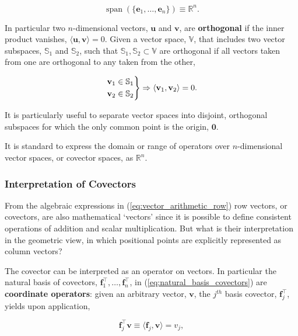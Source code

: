 \documentclass[12pt, twoside, draft]{article}
\begin{document}
\begin{equation}\label{eq:real_space}
\operatorname{span}(\{\mathbf{e}_1, \ldots, \mathbf{e}_n\}) \equiv \mathbb{R}^n.
\end{equation}

In particular two $n$-dimensional vectors, $\mathbf{u}$ and $\mathbf{v}$, are \textbf{orthogonal} if the inner product vanishes, $\langle \mathbf{u}, \mathbf{v} \rangle = 0$.  Given a vector space, $\mathbb{V}$, that includes two vector subspaces, $\mathbb{S}_1$ and $\mathbb{S}_2$, such that $\mathbb{S}_1, \mathbb{S}_2 \subset \mathbb{V}$ are orthogonal if all vectors taken from one are orthogonal to any taken from the other,

\begin{equation}\label{eq:orthogonal_subspaces}
\begin{rcases} \mathbf{v}_1 \in \mathbb{S}_1 \\ \mathbf{v}_2 \in \mathbb{S}_2 \end{rcases}
\Rightarrow \langle \mathbf{v}_1, \mathbf{v}_2 \rangle = 0.
\end{equation}

It is particularly useful to separate vector spaces into disjoint, orthogonal subspaces for which the only common point is the origin, $\mathbf{0}$.

It is standard to express the domain or range of operators over $n$-dimensional vector spaces, or covector spaces, as $\mathbb{R}^n$.

\subsubsection{Interpretation of Covectors}\label{sec:interpretation-covectors}
From the algebraic expressions in (\ref{eq:vector_arithmetic_row}) row vectors, or covectors, are also mathematical `vectors' since it is possible to define consistent operations of addition and scalar multiplication.  But what is their interpretation in the geometric view, in which positional points are explicitly represented as column vectors?

The covector can be interpreted as an operator on vectors.  In particular the natural basis of covectors, $\mathbf{f}_1^\top, \ldots, \mathbf{f}_n^\top$, in (\ref{eq:natural_basis_covectors}) are \textbf{coordinate operators}: given an arbitrary vector, $\mathbf{v}$, the $j^{th}$ basis covector, $\mathbf{f}_j^\top$, yields upon application,

\begin{equation}\label{eq:coordinate_operator}
\mathbf{f}_j^\top \mathbf{v} \equiv \langle \mathbf{f}_j, \mathbf{v} \rangle = v_j,
\end{equation}
\end{document}
